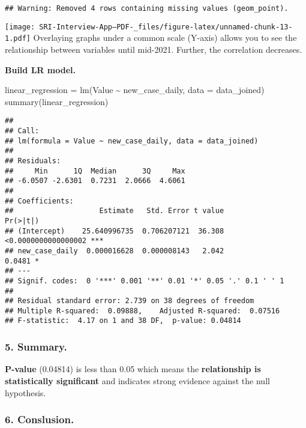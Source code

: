 \documentclass[
]{article}
\newenvironment{Shaded}{\begin{snugshade}}{\end{snugshade}}
\newcommand{\AttributeTok}[1]{\textcolor[rgb]{0.77,0.63,0.00}{#1}}
\newcommand{\FunctionTok}[1]{\textcolor[rgb]{0.00,0.00,0.00}{#1}}
\newcommand{\NormalTok}[1]{#1}
\newcommand{\OtherTok}[1]{\textcolor[rgb]{0.56,0.35,0.01}{#1}}
\newcommand{\SpecialCharTok}[1]{\textcolor[rgb]{0.00,0.00,0.00}{#1}}
\begin{document}
\begin{verbatim}
## Warning: Removed 4 rows containing missing values (geom_point).
\end{verbatim}

\texttt{[image: SRI-Interview-App--PDF-\_files/figure-latex/unnamed-chunk-13-1.pdf]}
Overlaying graphs under a common scale (Y-axis) allows you to see the
relationship between variables until mid-2021. Further, the correlation
decreases.

\textbf{Build LR model.}

\begin{Shaded}
\begin{Highlighting}[]
\NormalTok{linear\_regression }\OtherTok{=} \FunctionTok{lm}\NormalTok{(Value }\SpecialCharTok{\textasciitilde{}}\NormalTok{ new\_case\_daily, }\AttributeTok{data =}\NormalTok{ data\_joined)}
\FunctionTok{summary}\NormalTok{(linear\_regression)}
\end{Highlighting}
\end{Shaded}

\begin{verbatim}
## 
## Call:
## lm(formula = Value ~ new_case_daily, data = data_joined)
## 
## Residuals:
##     Min      1Q  Median      3Q     Max 
## -6.0507 -2.6301  0.7231  2.0666  4.6061 
## 
## Coefficients:
##                    Estimate   Std. Error t value            Pr(>|t|)    
## (Intercept)    25.640996735  0.706207121  36.308 <0.0000000000000002 ***
## new_case_daily  0.000016628  0.000008143   2.042              0.0481 *  
## ---
## Signif. codes:  0 '***' 0.001 '**' 0.01 '*' 0.05 '.' 0.1 ' ' 1
## 
## Residual standard error: 2.739 on 38 degrees of freedom
## Multiple R-squared:  0.09888,    Adjusted R-squared:  0.07516 
## F-statistic:  4.17 on 1 and 38 DF,  p-value: 0.04814
\end{verbatim}

\hypertarget{summary.}{%
\subsubsection{5. Summary.}\label{summary.}}

\textbf{P-value} (0.04814) is less than 0.05 which means the
\textbf{relationship is statistically significant} and indicates strong
evidence against the null hypothesis.

\hypertarget{conslusion.}{%
\subsubsection{6. Conslusion.}\label{conslusion.}}
\end{document}
